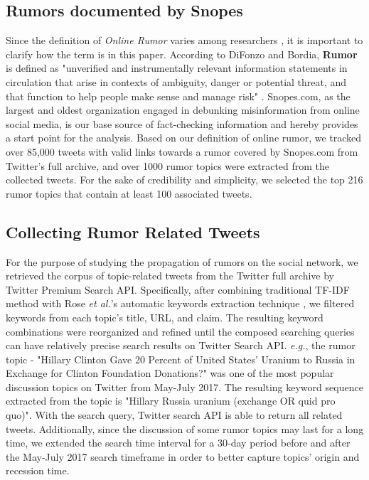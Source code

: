 \documentclass[conference]{IEEEtran}
\begin{document}
	\subsection{Rumors documented by Snopes}
	Since the definition of \textit{Online Rumor} varies among researchers \cite{kwon2013prominent}, it is important to clarify how the term is in this paper. According to DiFonzo and Bordia, \textbf{Rumor} is defined as "unverified and instrumentally relevant information statements in circulation that arise in contexts of ambiguity, danger or potential threat, and that function to help people make sense and manage risk" \cite{difonzo2007rumor}. Snopes.com, as the largest and oldest organization engaged in debunking misinformation from online social media, is our base source of fact-checking information and hereby provides a start point for the analysis. Based on our definition of online rumor, we tracked over 85,000 tweets with valid links towards a rumor covered by Snopes.com from Twitter's full archive, and over 1000 rumor topics were extracted from the collected tweets. For the sake of credibility and simplicity, we selected the top 216 rumor topics that contain at least 100 associated tweets. 
	
	\subsection{Collecting Rumor Related Tweets}
	For the purpose of studying the propagation of rumors on the social network, we retrieved the corpus of topic-related tweets from the Twitter full archive by Twitter Premium Search API. Specifically, after combining traditional TF-IDF method with Rose \textit{et al.}'s automatic keywords extraction technique \cite{rose2010automatic}, we filtered keywords from each topic's title, URL, and claim. The resulting keyword combinations were reorganized and refined until the composed searching queries can have relatively precise search results on Twitter Search API. \textit{e.g.}, the rumor topic - "Hillary Clinton Gave 20 Percent of United States’ Uranium to Russia in Exchange for Clinton Foundation Donations?" was one of the most popular discussion topics on Twitter from May-July 2017. The resulting keyword sequence extracted from the topic is "Hillary Russia uranium (exchange OR quid pro quo)". With the search query, Twitter search API is able to return all related tweets. Additionally, since the discussion of some rumor topics may last for a long time, we extended the search time interval for a 30-day period before and after the May-July 2017 search timeframe in order to better capture topics' origin and recession time.
	
\end{document}
